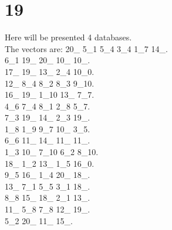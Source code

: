 \chapter{19}
\indent Here will be presented 4 databases.\\
The vectors are:
20\_ 5\_1 5\_4 3\_4 1\_7 14\_.\\6\_1 19\_ 20\_ 10\_ 10\_.\\17\_ 19\_ 13\_ 2\_4 10\_0.\\12\_ 8\_4 8\_2 8\_3 9\_10.\\16\_ 19\_ 1\_10 13\_ 7\_7.\\4\_6 7\_4 8\_1 2\_8 5\_7.\\7\_3 19\_ 14\_ 2\_3 19\_.\\1\_8 1\_9 9\_7 10\_ 3\_5.\\6\_6 11\_ 14\_ 11\_ 11\_.\\1\_3 10\_ 7\_10 6\_2 8\_10.\\18\_ 1\_2 13\_ 1\_5 16\_0.\\9\_5 16\_ 1\_4 20\_ 18\_.\\13\_ 7\_1 5\_5 3\_1 18\_.\\8\_8 15\_ 18\_ 2\_1 13\_.\\11\_ 5\_8 7\_8 12\_ 19\_.\\5\_2 20\_ 11\_ 15\_.\\